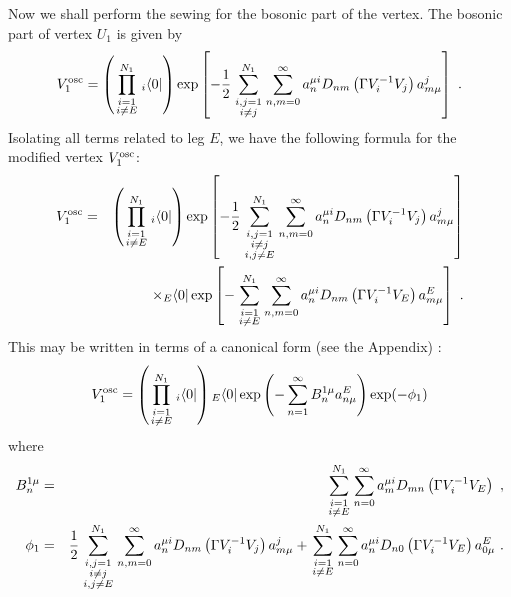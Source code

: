 \documentclass[a4paper,11pt]{article}
\begin{document}
Now we shall perform the sewing for the bosonic part of the vertex. The bosonic part of vertex $U_1$ is given by
\begin{equation}
\label{eq2}
V^{\rm osc}_1=\left( \prod_{\scriptstyle i=1\atop \scriptstyle i\neq E}^{N_1}{ }_i\langle 0|\right) \exp \left[ -\frac{1}{2}\sum_{\scriptstyle i,j=1\atop \scriptstyle i\neq j}^{N_1}\sum_{n,m=0}^\infty a^{\mu i}_nD_{nm}\left( \Gamma V^{-1}_iV_j\right) a^j_{m\mu }\right] \ .
\end{equation}
Isolating all terms related to leg $E$, we have the following formula for the modified vertex $V_1^{\rm osc}$:
\begin{eqnarray}
V^{\rm osc}_1 & = & \left( \prod_{\scriptstyle i=1\atop \scriptstyle i\neq E}^{N_1}{ }_i\langle 0|\right) \exp \left[ -\frac{1}{2}\sum_{{\scriptstyle i,j=1\atop \scriptstyle i\neq j}\atop \scriptstyle i,j\neq E}^{N_1}\sum_{n,m=0}^\infty a^{\mu i}_nD_{nm}\left( \Gamma V^{-1}_iV_j\right) a^j_{m\mu }\right] \\
 & & \times { }_E\langle0|\exp \left[ -\sum_{\scriptstyle i=1\atop \scriptstyle i\neq E}^{N_1}\sum_{n,m=0}^\infty a^{\mu i}_nD_{nm}\left( \Gamma V^{-1}_iV_E\right) a^E_{m\mu }\right] \ .
\end{eqnarray}
This may be written in terms of a canonical form (see the Appendix) \cite{cg1}:
\begin{equation}
V^{\rm osc}_1=\left( \prod_{\scriptstyle i=1\atop \scriptstyle i\neq E}^{N_1}{ }_i\langle 0|\right) { }_E\langle 0|\exp \left( -\sum_{n=1}^\infty B^{1\mu }_na^E_{n\mu }\right) \exp (-\phi _1)
\end{equation}
where
\begin{eqnarray}
B^{1\mu }_n & = & \sum_{\scriptstyle i=1\atop \scriptstyle i\neq E}^{N_1}\sum_{n=0}^\infty a^{\mu i}_mD_{mn}\left( \Gamma V^{-1}_iV_E\right) \ ,\\ 
\phi _1 & = & \frac{1}{2}\sum_{{\scriptstyle i,j=1\atop \scriptstyle i\neq j}\atop \scriptstyle i,j\neq E}^{N_1}\sum_{n,m=0}^\infty a^{\mu i}_nD_{nm}\left( \Gamma V^{-1}_iV_j\right) a^j_{m\mu } +\sum_{\scriptstyle i=1\atop \scriptstyle i\neq E}^{N_1}\sum_{n=0}^\infty a^{\mu i}_nD_{n0}\left( \Gamma V^{-1}_iV_E\right) a^E_{0\mu }\ .
\end{eqnarray}
\end{document}
